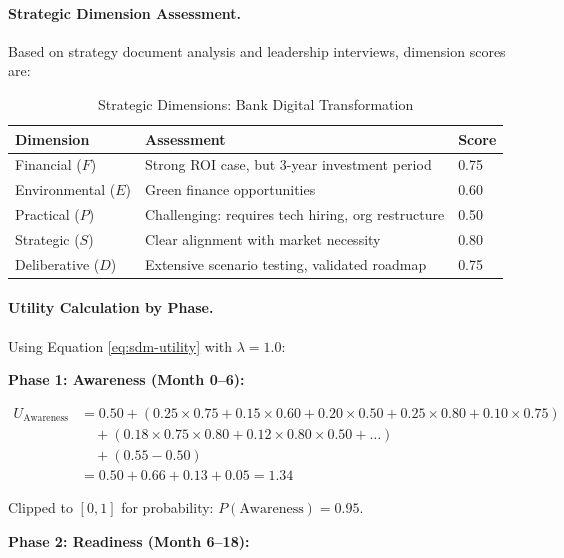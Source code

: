 \paragraph{Strategic Dimension Assessment.}

Based on strategy document analysis and leadership interviews, dimension scores are:

\begin{table}[htbp]
\centering
\caption{Strategic Dimensions: Bank Digital Transformation}
\label{tab:sdm-case-dimensions}
\renewcommand{\arraystretch}{1.3}
\begin{tabular}{@{}lll@{}}
\toprule
\textbf{Dimension} & \textbf{Assessment} & \textbf{Score} \\
\midrule
Financial ($F$) & Strong ROI case, but 3-year investment period & 0.75 \\
Environmental ($E$) & Green finance opportunities & 0.60 \\
Practical ($P$) & Challenging: requires tech hiring, org restructure & 0.50 \\
Strategic ($S$) & Clear alignment with market necessity & 0.80 \\
Deliberative ($D$) & Extensive scenario testing, validated roadmap & 0.75 \\
\bottomrule
\end{tabular}
\end{table}

\paragraph{Utility Calculation by Phase.}

Using Equation \ref{eq:sdm-utility} with $\lambda = 1.0$:

\textbf{Phase 1: Awareness (Month 0--6):}

\begin{align}
U_{\text{Awareness}} &= 0.50 + (0.25 \times 0.75 + 0.15 \times 0.60 + 0.20 \times 0.50 + 0.25 \times 0.80 + 0.10 \times 0.75) \\
&\quad + (0.18 \times 0.75 \times 0.80 + 0.12 \times 0.80 \times 0.50 + \ldots) \\
&\quad + (0.55 - 0.50) \\
&= 0.50 + 0.66 + 0.13 + 0.05 = 1.34
\end{align}

Clipped to $[0, 1]$ for probability: $P(\text{Awareness}) = 0.95$.

\textbf{Phase 2: Readiness (Month 6--18):}

